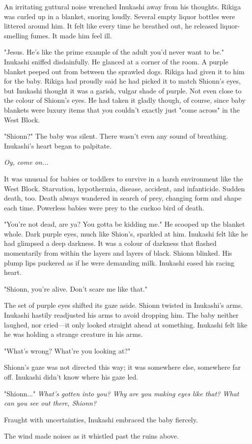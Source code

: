 An irritating guttural noise wrenched Inukashi away from his thoughts.
Rikiga was curled up in a blanket, snoring loudly. Several empty liquor
bottles were littered around him. It felt like every time he breathed
out, he released liquor-smelling fumes. It made him feel ill.

"Jesus. He's like the prime example of the adult you'd never want to
be." Inukashi sniffed disdainfully. He glanced at a corner of the room.
A purple blanket peeped out from between the sprawled dogs. Rikiga had
given it to him for the baby. Rikiga had proudly said he had picked it
to match Shionn's eyes, but Inukashi thought it was a garish, vulgar
shade of purple. Not even close to the colour of Shionn's eyes. He had
taken it gladly though, of course, since baby blankets were luxury items
that you couldn't exactly just "come across" in the West Block.

"Shionn?" The baby was silent. There wasn't even any sound of breathing.
Inukashi's heart began to palpitate.

\emph{Oy, come on...}

It was unusual for babies or toddlers to survive in a harsh environment
like the West Block. Starvation, hypothermia, disease, accident, and
infanticide. Sudden death, too. Death always wandered in search of prey,
changing form and shape each time. Powerless babies were prey to the
cuckoo bird of death.

"You're not dead, are ya? You gotta be kidding me." He scooped up the
blanket whole. Dark purple eyes, much like Shion's, sparkled at him.
Inukashi felt like he had glimpsed a deep darkness. It was a colour of
darkness that flashed momentarily from within the layers and layers of
black. Shionn blinked. His plump lips puckered as if he were demanding
milk. Inukashi eased his racing heart.

"Shionn, you're alive. Don't scare me like that."

The set of purple eyes shifted its gaze aside. Shionn twisted in
Inukashi's arms. Inukashi hastily readjusted his arms to avoid dropping
him. The baby neither laughed, nor cried---it only looked straight ahead
at something. Inukashi felt like he was holding a strange creature in
his arms.

"What's wrong? What're you looking at?"

Shionn's gaze was not directed this way; it was somewhere else,
somewhere far off. Inukashi didn't know where his gaze led.

"Shionn..." \emph{What's gotten into you? Why are you making eyes like that?
What can you see out there, Shionn?}

Fraught with uncertainties, Inukashi embraced the baby fiercely.

The wind made noises as it whistled past the ruins above.